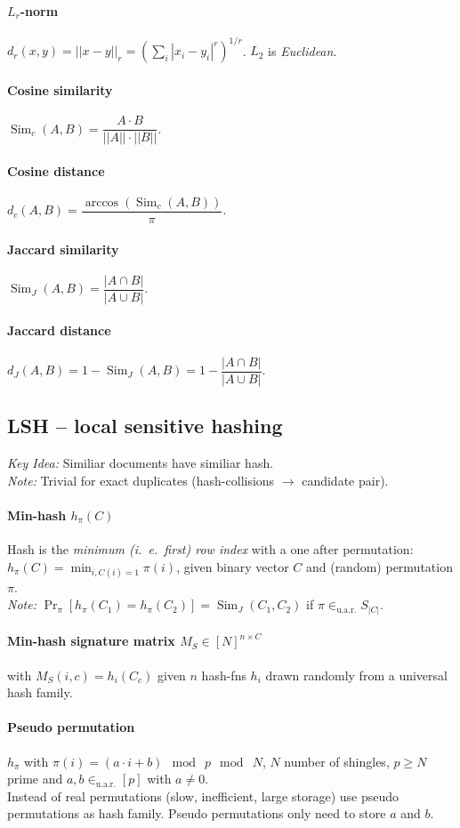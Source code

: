 \documentclass[a4paper, 9pt, DIV=24]{scrartcl}
\DeclareMathOperator{\Sim}{Sim}
\newcommand{\inuar}{\in_{\text{u.a.r.}}}
\begin{document}
\begin{twocolumn}
\paragraph{$L_r$-norm}
$d_r(x,y) = ||x-y||_r = (\sum_i |x_i - y_i|^r)^{1/r}$. $L_2$ is \emph{Euclidean}.
\paragraph{Cosine similarity} $\Sim_c(A,B) = \dfrac{A \cdot B}{||A||\cdot||B||}.$ 
\paragraph{Cosine distance} $d_c(A,B) = \dfrac{\arccos(\Sim_c(A,B))}{\pi}.$
\paragraph{Jaccard similarity} $\Sim_J(A,B) = \dfrac{|A \cap B|}{|A \cup B|}.$ 
\paragraph{Jaccard distance}
$ d_J(A,B) = 1 - \Sim_J(A,B) = 1 - \dfrac{|A \cap B|}{|A \cup B|}.$

\subsection{LSH -- local sensitive hashing}
\emph{Key Idea:} Similiar documents have similiar hash. \\
\emph{Note:} Trivial for exact duplicates (hash-collisions $\rightarrow$ candidate pair).
\paragraph{Min-hash $h_\pi(C)$}
Hash is the \emph{minimum (i.\ e.\ first) row index} with a one after permutation: $h_\pi(C) = \min_{i, C(i) = 1} \pi(i)$,
given binary vector $C$ and (random) permutation $\pi$. \\
\emph{Note:} $\Pr_\pi[h_\pi(C_1) = h_\pi(C_2)] = \Sim_J(C_1,C_2)$ if $\pi \inuar S_{|C|}$.
\paragraph{Min-hash signature matrix $M_S \in [N]^{n\times C}$}
with $M_S(i,c) = h_i(C_c)$
given $n$ hash-fns $h_i$ drawn randomly from a universal hash family.

\paragraph{Pseudo permutation}
$h_\pi$ with $\pi(i) = (a\cdot i + b) \mod\ p \mod\ N$, $N$ number of shingles, $p\geq N$ prime and $a,b \inuar [p]$ with $a \neq 0$. \\
Instead of real permutations (slow, inefficient, large storage) use pseudo permutations as hash family. Pseudo permutations only need to store $a$ and $b$.


\end{twocolumn}
\end{document}
